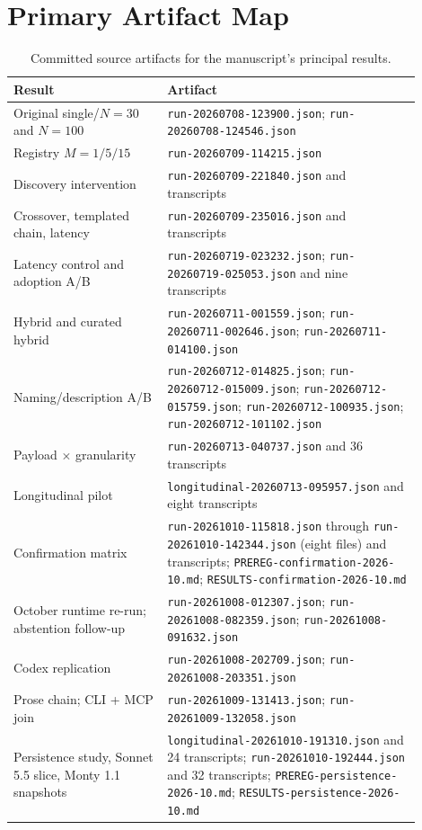 \documentclass[10pt,twocolumn]{article}
\begin{document}
\section{Primary Artifact Map}
\label{app:artifacts}

\begin{table}[H]
\centering
\small
\caption{Committed source artifacts for the manuscript's principal results.}
\begin{tabular}{>{\raggedright\arraybackslash}p{0.34\linewidth}>{\raggedright\arraybackslash}p{0.56\linewidth}}
\toprule
Result & Artifact \\
\midrule
Original single/$N=30$ and $N=100$ &
\texttt{run-20260708-123900.json}; \texttt{run-20260708-124546.json} \\
Registry $M=1/5/15$ & \texttt{run-20260709-114215.json} \\
Discovery intervention & \texttt{run-20260709-221840.json} and transcripts \\
Crossover, templated chain, latency & \texttt{run-20260709-235016.json} and transcripts \\
Latency control and adoption A/B & \texttt{run-20260719-023232.json};
\texttt{run-20260719-025053.json} and nine transcripts \\
Hybrid and curated hybrid & \texttt{run-20260711-001559.json};
\texttt{run-20260711-002646.json}; \texttt{run-20260711-014100.json} \\
Naming/description A/B & \texttt{run-20260712-014825.json};
\texttt{run-20260712-015009.json}; \texttt{run-20260712-015759.json};
\texttt{run-20260712-100935.json}; \texttt{run-20260712-101102.json} \\
Payload $\times$ granularity & \texttt{run-20260713-040737.json} and 36 transcripts \\
Longitudinal pilot &
\texttt{longitudinal-20260713-095957.json} and eight transcripts \\
Confirmation matrix &
\texttt{run-20261010-115818.json} through \texttt{run-20261010-142344.json}
(eight files) and transcripts; \texttt{PREREG-confirmation-2026-10.md};
\texttt{RESULTS-confirmation-2026-10.md} \\
October runtime re-run; abstention follow-up & \texttt{run-20261008-012307.json};
\texttt{run-20261008-082359.json}; \texttt{run-20261008-091632.json} \\
Codex replication & \texttt{run-20261008-202709.json};
\texttt{run-20261008-203351.json} \\
Prose chain; CLI + MCP join & \texttt{run-20261009-131413.json};
\texttt{run-20261009-132058.json} \\
Persistence study, Sonnet 5.5 slice, Monty 1.1 snapshots &
\texttt{longitudinal-20261010-191310.json} and 24 transcripts;
\texttt{run-20261010-192444.json} and 32 transcripts;
\texttt{PREREG-persistence-2026-10.md}; \texttt{RESULTS-persistence-2026-10.md} \\
\bottomrule
\end{tabular}
\end{table}
\end{document}
